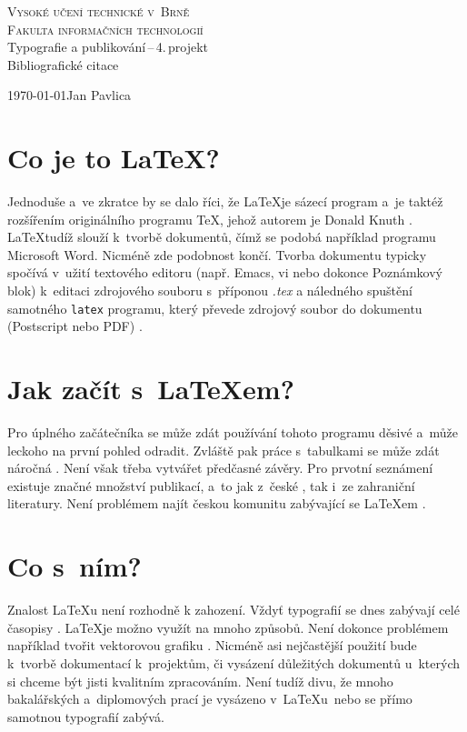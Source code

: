\documentclass[11pt,a4paper,titlepage]{article}
\begin{document}
\begin{titlepage}
\begin{center}
{\Huge\textsc{Vysoké učení technické v~Brně}}\\
\medskip
{\huge\textsc{Fakulta informačních technologií}}\\
{\LARGE Typografie a publikování\,--\,4.\,projekt}\\
\medskip
{\Huge Bibliografické citace}\\
\end{center}
{\Large \today \hfill Jan Pavlica}
\end{titlepage}

\section{Co je to \LaTeX?}
Jednoduše a~ve zkratce by se dalo říci, že \LaTeX je sázecí program a~je taktéž rozšířením originálního programu \TeX, jehož autorem je Donald Knuth \cite{Latex_tutorials}. \LaTeX tudíž slouží k~tvorbě dokumentů, čímž se podobá například programu Microsoft Word. Nicméně zde podobnost končí. Tvorba dokumentu typicky spočívá v~užití textového editoru (např. Emacs, vi nebo dokonce Poznámkový blok) k~editaci zdrojového souboru s~příponou \emph{.tex} a náledného spuštění samotného \texttt{latex} programu, který převede zdrojový soubor do dokumentu (Postscript nebo PDF) \cite{McPeak:What_the_heck_is_Latex?}.

\section{Jak začít s~\LaTeX em?}
Pro úplného začátečníka se může zdát používání tohoto programu děsivé a~může leckoho na první pohled odradit. Zvláště pak práce s~tabulkami se může zdát náročná \cite{UU:Tables}. Není však třeba vytvářet předčasné závěry. Pro prvotní seznámení existuje značné množství publikací, a~to jak z~české \cite{Rybicka:Latex_pro_zacatecniky}, tak i~ze zahraniční \cite{Kottwitz:LaTeX_Begginers_Guide} literatury. Není problémem najít českou komunitu zabývající se \LaTeX em \cite{CSTug:web}.

\section{Co s~ním?}
Znalost \LaTeX u není rozhodně k zahození. Vždyť typografií se dnes zabývají celé časopisy \cite{Baseline}. \LaTeX je možno využít na mnoho způsobů. Není dokonce problémem například tvořit vektorovou grafiku \cite{UU:Vector}. Nicméně asi nejčastější použití bude k~tvorbě dokumentací k~projektům, či vysázení důležitých dokumentů u~kterých si chceme být jisti kvalitním zpracováním. Není tudíž divu, že mnoho bakalářských \cite{Pysny:BiBTex} a~diplomových prací \cite{Kyselak:Revizni_system_pro_LaTeX} je vysázeno v~\LaTeX u~nebo se přímo samotnou typografií zabývá.

\newpage

\end{document}
